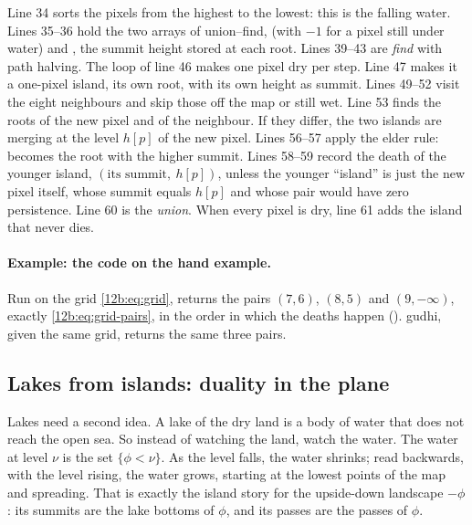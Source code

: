 \noindent Line 34 sorts the pixels from the highest to the lowest: this is the falling water. Lines 35--36 hold
the two arrays of union--find,  (with $-1$ for a pixel still under water) and , the
summit height stored at each root. Lines 39--43 are \emph{find} with path halving. The loop of line 46 makes one
pixel dry per step. Line 47 makes it a one-pixel island, its own root, with its own height as summit. Lines
49--52 visit the eight neighbours and skip those off the map or still wet. Line 53 finds the roots of the new
pixel and of the neighbour. If they differ, the two islands are merging at the level $h[p]$ of the new pixel. Lines
56--57 apply the elder rule:  becomes the root with the higher summit. Lines 58--59 record the death of
the younger island, $(\text{its summit},\ h[p])$, unless the younger ``island'' is just the new pixel itself, whose
summit equals $h[p]$ and whose pair would have zero persistence. Line 60 is the \emph{union}. When every pixel is
dry, line 61 adds the island that never dies.

\paragraph{Example: the code on the hand example.} Run on the grid \eqref{12b:eq:grid},  returns the
pairs $(7,6)$, $(8,5)$ and $(9,-\infty)$, exactly \eqref{12b:eq:grid-pairs}, in the order in which the deaths happen
(). gudhi, given the same grid, returns the same three pairs.

\subsection{Lakes from islands: duality in the plane}
\label{12b:sec:lakes}

Lakes need a second idea. A lake of the dry land is a body of water that does not reach the open sea. So instead
of watching the land, watch the water. The water at level $\nu$ is the set $\{\phi<\nu\}$. As the level falls, the
water shrinks; read backwards, with the level rising, the water grows, starting at the lowest points of the map and
spreading. That is exactly the island story for the upside-down landscape $-\phi$: its summits are the lake bottoms
of $\phi$, and its passes are the passes of $\phi$.

